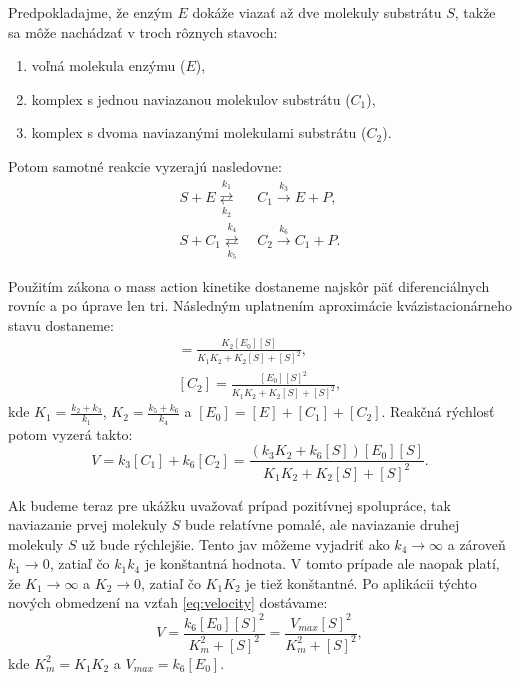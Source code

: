 \documentclass[11pt,final,oneside]{fithesis}
\begin{document}
Predpokladajme, \v ze enz\'ym $E$ dok\'a\v ze viaza\v t a\v z dve molekuly substr\'atu $S$, tak\v ze sa m\^ o\v ze nach\'adza\v t v troch r\^ oznych stavoch:
\begin{enumerate}
\item vo\v ln\'a molekula enz\'ymu ($E$),
\item komplex s jednou naviazanou molekulov substr\'atu ($C_1$),
\item komplex s dvoma naviazan\'ymi molekulami substr\'atu ($C_2$).
\end{enumerate}
Potom samotn\'e reakcie vyzeraj\'u nasledovne:
\begin{align}
S + E \underset{k_2}{\overset{k_1}{\rightleftarrows}} \ &C_1 \overset{k_3}{\longrightarrow} E + P,\\
S + C_1 \underset{k_5}{\overset{k_4}{\rightleftarrows}} \ &C_2 \overset{k_6}{\longrightarrow} C_1 + P.
\end{align}

Pou\v zit\'im z\'akona o mass action kinetike dostaneme najsk\^ or p\"a\v t diferenci\'alnych rovn\'ic a po \'uprave len tri. N\'asledn\'ym uplatnen\'im
aproxim\'acie kv\'azistacion\'arneho stavu dostaneme:
\begin{align}
[C_1] = \frac{K_2[E_0][S]}{K_1K_2 + K_2[S] + [S]^2},\\
[C_2] = \frac{[E_0][S]^2}{K_1K_2 + K_2[S] + [S]^2},
\end{align}
kde $K_1 = \frac{k_2 + k_3}{k_1}$, $K_2 = \frac{k_5 + k_6}{k_4}$ a $[E_0] = [E] + [C_1] + [C_2]$. Reak\v cn\'a r\'ychlos\v t potom vyzer\'a takto:
\begin{equation}
\label{eq:velocity}
V = k_3[C_1] + k_6[C_2] = \frac{(k_3K_2 + k_6[S])[E_0][S]}{K_1K_2 + K_2[S] + [S]^2}.
\end{equation}

Ak budeme teraz pre uk\'a\v zku uva\v zova\v t pr\'ipad pozit\'ivnej spolupr\'ace, tak naviazanie prvej molekuly $S$ bude relat\'ivne pomal\'e, ale
naviazanie druhej molekuly $S$ u\v z bude r\'ychlej\v sie. Tento jav m\^ o\v zeme vyjadri\v t ako $k_4 \rightarrow \infty$ a z\'arove\v n $k_1 \rightarrow 0$,
zatia\v l \v co $k_1k_4$ je kon\v stantn\'a hodnota. V tomto pr\'ipade ale naopak plat\'i, \v ze $K_1 \rightarrow \infty$ a $K_2 \rightarrow 0$, zatia\v l 
\v co $K_1K_2$ je tie\v z kon\v stantn\'e. Po aplik\'acii t\'ychto nov\'ych obmedzen\'i na vz\v tah \ref{eq:velocity} dost\'avame:
\begin{equation}
V = \frac{k_6[E_0][S]^2}{K_m^2 + [S]^2} = \frac{V_{max}[S]^2}{K_m^2 + [S]^2},
\end{equation}
kde $K_m^2 = K_1K_2$ a $V_{max} = k_6[E_0]$.
\end{document}
